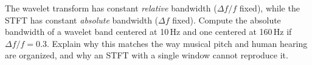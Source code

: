\begin{exercise}
\label{ch24:ex-relative}
The wavelet transform has constant \emph{relative} bandwidth ($\Delta f / f$
fixed), while the STFT has constant \emph{absolute} bandwidth ($\Delta f$ fixed).
Compute the absolute bandwidth of a wavelet band centered at 10\,Hz and one
centered at 160\,Hz if $\Delta f / f = 0.3$. Explain why this matches the way
musical pitch and human hearing are organized, and why an STFT with a single
window cannot reproduce it.
\end{exercise}
